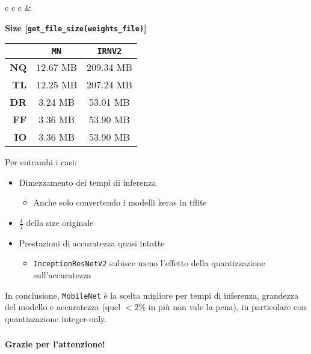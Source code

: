 \documentclass{beamer}
\newcommand{\dflvspace}{\vspace{10pt}}
\begin{document}
\begin{frame}
\begin{center}
\begin{tabular} { c c c }
    		&
    		
    		\begin{minipage}[t]{0.35\linewidth}
    		\textbf{Size [\texttt{get\_file\_size(weights\_file)}]}
    		
    		\begin{tabular}{ | r | c | c | }
    		\hline
    		& \texttt{MN} & \texttt{IRNV2} \\
    		\hline
    		\hline
    		\textbf{NQ} & 12.67 MB & 209.34 MB \\
    		\hline
    		\textbf{TL} & 12.25 MB & 207.24 MB\\
    		\hline
    		\textbf{DR} & 3.24 MB & 53.01 MB \\
    		\hline
    		\textbf{FF} & 3.36 MB & 53.90 MB \\
    		\hline
    		\textbf{IO} & 3.36 MB & 53.90 MB \\
    		\hline
    		\end{tabular}
    		\end{minipage}
	\end{tabular}
	\end{center}
	
	\dflvspace
	
	\fontsize{10pt}{11pt}\selectfont
	
	Per entrambi i casi:
	\begin{itemize}
		\item Dimezzamento dei tempi di inferenza
			\begin{itemize}
				\item Anche solo convertendo i modelli keras in tflite
			\end{itemize}
		\item $\displaystyle{\frac{1}{4}}$ della size originale
		\item Prestazioni di accuratezza quasi intatte
			\begin{itemize}
				\item \texttt{InceptionResNetV2} subisce meno l'effetto della quantizzazione sull'accuratezza
			\end{itemize}
	\end{itemize}
	
	\dflvspace
	
	In conclusione, \texttt{MobileNet} è la scelta migliore per tempi di inferenza, grandezza del modello e accuratezza 
	(quel $<2\%$ in più non vale la pena), in particolare con quantizzazione integer-only.
\end{frame}

\begin{frame}
    \frametitle{}
    
    \fontsize{30pt}{10pt}\selectfont
    \centering
    \textbf{Grazie per l'attenzione!}
    
\end{frame}
\end{document}
